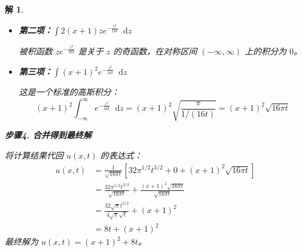 \documentclass[12pt,a4paper]{article}
\newcommand{\diff}{\mathop{}\!\mathrm{d}}  %
\newtheorem*{solution}{解}
\begin{document}
\begin{solution}
\begin{itemize}
			\item \textbf{第二项：$\int 2(x+1)z e^{-\frac{z^2}{16t}} \diff z$}
			
			被积函数 $z e^{-\frac{z^2}{16t}}$ 是关于 $z$ 的奇函数，在对称区间 $(-\infty, \infty)$ 上的积分为 $0$。
			
			\item \textbf{第三项：$\int (x+1)^2 e^{-\frac{z^2}{16t}} \diff z$}
			
			这是一个标准的高斯积分：
			\[ (x+1)^2 \int_{-\infty}^\infty e^{-\frac{z^2}{16t}} \diff z = (x+1)^2 \sqrt{\frac{\pi}{1/(16t)}} = (x+1)^2 \sqrt{16\pi t} \]
		\end{itemize}
		
		\hrulefill
		
		\textbf{步骤4. 合并得到最终解}
		
		\noindent
		将计算结果代回 $u(x,t)$ 的表达式：
		\begin{align*}
			u(x,t) &= \frac{1}{\sqrt{16\pi t}} \left[ 32\pi^{1/2}t^{3/2} + 0 + (x+1)^2 \sqrt{16\pi t} \right] \\
			&= \frac{32\pi^{1/2}t^{3/2}}{\sqrt{16\pi t}} + \frac{(x+1)^2 \sqrt{16\pi t}}{\sqrt{16\pi t}} \\
			&= \frac{32\sqrt{\pi}t^{3/2}}{4\sqrt{\pi}\sqrt{t}} + (x+1)^2 \\
			&= 8t + (x+1)^2
		\end{align*}
		最终解为 $u(x,t) = (x+1)^2 + 8t$。
	\end{solution}
	\hrulefill
	
\end{document}
